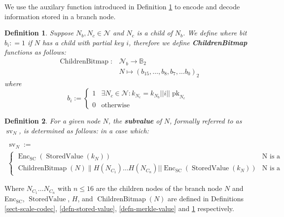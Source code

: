 \documentclass{article}
\newcommand{\assign}{:=}
\newcommand{\nobracket}{}
\newcommand{\tmop}[1]{\ensuremath{\operatorname{#1}}}
\newcommand{\tmrsub}[1]{\ensuremath{_{\textrm{#1}}}}
\newcommand{\tmstrong}[1]{\textbf{#1}}
\newcommand{\tmtextbf}[1]{{\bfseries{#1}}}
\newtheorem{definition}{Definition}
\providecommand{\nobracket}{}
\providecommand{\tmop}[1]{\ensuremath{\mathrm{#1}}}
\providecommand{\tmrsub}[1]{\tmrsub{\ensuremath{\mathrm{#1}}}}
\providecommand{\tmstrong}[1]{\tmtextbf{#1}}
\providecommand{\tmtextbf}[1]{\tmtextbf{#1}}
\newtheorem{definition}{Definition}
\begin{document}
We use the auxilary function introduced in Definition
\ref{defn-children-bitmap} to encode and decode information stored in a branch
node.

\begin{definition}
  \label{defn-children-bitmap}Suppose $N_b, N_c \in \mathcal{N}$ and $N_c$ is
  a child of $N_b$. We define where bit $b_i : = 1$ if $N$ has a child with
  partial key $i$, therefore we define {\tmstrong{ChildrenBitmap}} functions
  as follows:
  \[ \begin{array}{cc}
       \tmop{ChildrenBitmap} : & \mathcal{N}_b \rightarrow \mathbb{B}_2\\
       & N \mapsto (b_{15}, \ldots, b_8, b_7, \ldots b_0)_2
     \end{array} \]
  where
  \[ b_i \assign \left\{ \begin{array}{cc}
       1 & \exists N_c \in \mathcal{N}: k_{N_c} = k_{N_b} | | i | |
       \tmop{pk}_{N_c}\\
       0 & \text{otherwise}
     \end{array} \right. \]
\end{definition}

\begin{definition}
  \label{defn-node-subvalue}For a given node $N$, the {\tmstrong{subvalue}} of
  $N$, formally referred to as $\tmop{sv}_N$, is determined as follows: in a
  case which:
  \begin{itemize}
    \[ \begin{array}{l}
         \tmop{sv}_N \assign\\
         \left\{ \begin{array}{cc}
           \tmop{Enc}_{\tmop{SC}} (\tmop{StoredValue} (k_N)) & \text{N is a
           leaf node}\\
           \nobracket \tmop{ChildrenBitmap} (N)\|H (N_{C_1}) \ldots H
           (N_{C_n}) | | \tmop{Enc}_{\tmop{SC}} (\tmop{StoredValue} (k_N))  &
           \text{N is a branch node}
         \end{array} \right.
       \end{array} \]
  \end{itemize}
\end{definition}

Where $N_{C_1} \ldots N_{C_n}$ with $n \leqslant 16$ are the children nodes of
the branch node $N$ and Enc\tmrsub{SC}, $\tmop{StoredValue}$, $H$, and
$\tmop{ChildrenBitmap} (N)$ are defined in Definitions \ref{sect-scale-codec},
\ref{defn-stored-value}, \ref{defn-merkle-value} and
\ref{defn-children-bitmap} respectively.
\end{document}
